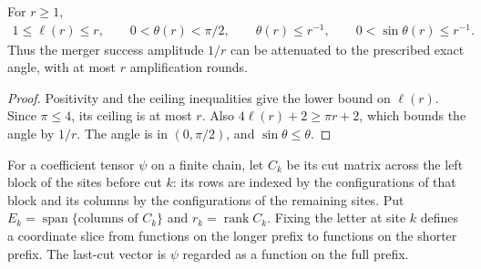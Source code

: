 \begin{lemma}
    \label{thm:mpu_exact_amplification_budget}
    \leanok
    For $r\geq1$,
    \begin{align}
        1\leq\ell(r)\leq r,\qquad
        0<\theta(r)<\pi/2,\qquad
        \theta(r)\leq r^{-1},\qquad
        0<\sin\theta(r)\leq r^{-1}.
    \end{align}
    Thus the merger success amplitude $1/r$ can be attenuated to
    the prescribed exact angle, with at most $r$ amplification rounds.
\end{lemma}
\begin{proof}\leanok
    Positivity and the ceiling inequalities give the lower bound on
    $\ell(r)$. Since $\pi\leq4$, its ceiling is at most $r$.
    Also $4\ell(r)+2\geq\pi r+2$, which bounds the angle by $1/r$.
    The angle is in $(0,\pi/2)$, and $\sin\theta\leq\theta$.
\end{proof}

\begin{definition}
    \label{def:mpu_minimal_physical_cut_spaces}
    \leanok
    For a coefficient tensor $\psi$ on a finite chain, let $C_k$ be
    its cut matrix across the left block of the sites before cut $k$:
    its rows are indexed by the configurations of that block and its
    columns by the configurations of the remaining sites.
    Put $E_k=\operatorname{span}\{\text{columns of }C_k\}$ and
    $r_k=\operatorname{rank}C_k$. Fixing the letter at site $k$
    defines a coordinate slice from functions on the longer prefix
    to functions on the shorter prefix. The last-cut vector is $\psi$
    regarded as a function on the full prefix.
\end{definition}

